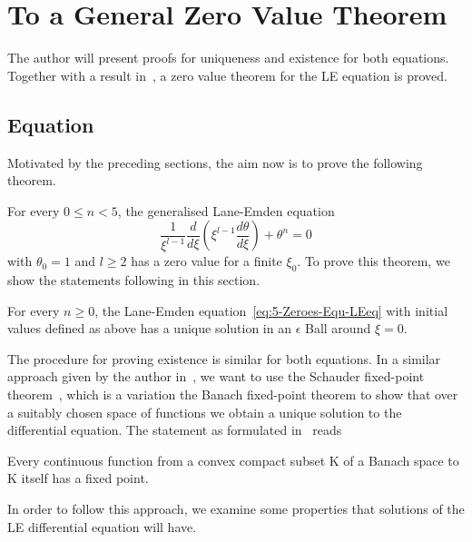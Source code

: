 \section{To a General Zero Value Theorem}
\label{sec:5-zeroes}
The author will present proofs for uniqueness and existence for both equations.
Together with a result in~\cite{quittnerSuperlinearParabolicProblems2007}, a zero value theorem for the \ac{LE} equation is proved.
\subsection{\texorpdfstring{}{LE} Equation}
\label{subsec:5-zeroes-le-equation}
Motivated by the preceding sections, the aim now is to prove the following theorem.
\begin{theorem}
	\label{5-Zeroes-Theo-Lane-EmdenFiniteBoundary}
	For every $0\leq n<5$, the generalised Lane-Emden equation
	\begin{equation}
		\frac{1}{\xi^{l-1}}\frac{d}{d\xi}\left(\xi^{l-1}\frac{d\theta}{d\xi}\right)+\theta^n=0
		\label{eq:5-Zeroes-Equ-LEeq}
	\end{equation}
	with $\theta_0=1$ and $l\geq2$ has a zero value for a finite $\xi_0$.
	To prove this theorem, we show the statements following in this section.
\end{theorem}
\begin{lemma}
	\label{5-Zeroes-Lem-Lane-Emden-Local-Existence}
	For every $n\geq0$, the Lane-Emden equation~\ref{eq:5-Zeroes-Equ-LEeq} with initial values defined as above has a unique solution in an $\epsilon$ Ball around $\xi=0$.
\end{lemma}\noindent
The procedure for proving existence is similar for both equations.
In a similar approach given by the author in~\cite[p.~50]{quittnerSuperlinearParabolicProblems2007}, we want to use the Schauder fixed-point theorem~\cite{schauderFixpunktsatzFunktionalraumen1930}, which is a variation the Banach fixed-point theorem to show that over a suitably chosen space of functions we obtain a unique solution to the differential equation.
The statement as formulated in~\cite{minazzoTheoremesPointFixe2007} reads
\begin{theorem}
	Every continuous function from a convex compact subset K of a Banach space to K itself has a fixed point.
\end{theorem}\noindent
In order to follow this approach, we examine some properties that solutions of the \ac{LE} differential equation will have.
